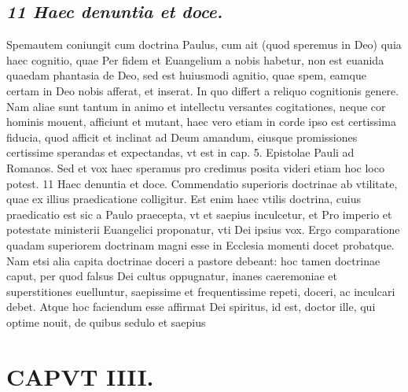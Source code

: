 \documentclass{article}
\begin{document}
\begin{pages}
\subsection*{\textit{11 Haec denuntia et doce.}}Spemautem coniungit cum doctrina Paulus, cum ait (quod speremus in Deo) quia haec cognitio, quae Per fidem et Euangelium a nobis habetur, non est euanida quaedam phantasia de Deo, sed est huiusmodi agnitio, quae spem, eamque certam in Deo nobis afferat, et inserat. In quo differt a reliquo cognitionis genere. Nam aliae sunt tantum in animo et intellectu versantes cogitationes, neque cor hominis mouent, afficiunt et mutant, haec vero etiam in corde ipso est certissima fiducia, quod afficit et inclinat ad Deum amandum, eiusque promissiones certissime sperandas et expectandas, vt est in cap. 5. Epistolae Pauli ad Romanos. Sed et vox haec speramus pro credimus posita videri etiam hoc loco potest. 11 Haec denuntia et doce. Commendatio superioris doctrinae ab vtilitate, quae ex illius praedicatione colligitur. Est enim haec vtilis doctrina, cuius praedicatio est sic a Paulo praecepta, vt et saepius inculcetur, et Pro imperio et potestate ministerii Euangelici proponatur, vti Dei ipsius vox. Ergo comparatione quadam superiorem doctrinam magni esse in Ecclesia momenti docet probatque. Nam etsi alia capita doctrinae doceri a pastore debeant: hoc tamen doctrinae caput, per quod falsus Dei cultus oppugnatur, inanes caeremoniae et superstitiones euelluntur, saepissime et frequentissime repeti, doceri, ac inculcari debet. Atque hoc faciendum esse affirmat Dei spiritus, id est, doctor ille, qui optime nouit, de quibus sedulo et saepius  \pend
\section*{CAPVT  IIII. }
\marginpar{[ p.227 ]}\pstart {}
{}

\end{pages}
\end{document}

